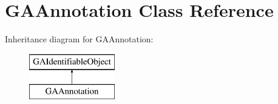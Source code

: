 \hypertarget{class_g_a_annotation}{}\section{G\+A\+Annotation Class Reference}
\label{class_g_a_annotation}
Inheritance diagram for G\+A\+Annotation\+:\begin{figure}[H]
\begin{center}
\leavevmode
\includegraphics[height=2.000000cm]{class_g_a_annotation}
\end{center}
\end{figure}
